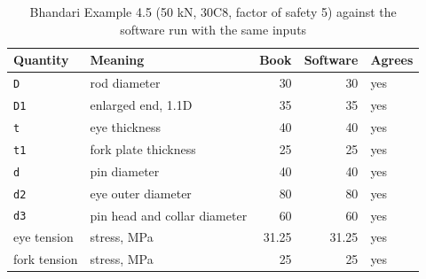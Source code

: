 \begin{table}[htbp]
\centering\footnotesize
\caption{Bhandari Example 4.5 (50 kN, 30C8, factor of safety 5) against the software run with the same inputs}\label{tab:bhandari}
\begin{tabularx}{\textwidth}{llrrl}
\toprule
Quantity & Meaning & Book & Software & Agrees \\
\midrule
\texttt{D} & rod diameter & 30 & 30 & yes \\
\texttt{D1} & enlarged end, 1.1D & 35 & 35 & yes \\
\texttt{t} & eye thickness & 40 & 40 & yes \\
\texttt{t1} & fork plate thickness & 25 & 25 & yes \\
\texttt{d} & pin diameter & 40 & 40 & yes \\
\texttt{d2} & eye outer diameter & 80 & 80 & yes \\
\texttt{d3} & pin head and collar diameter & 60 & 60 & yes \\
eye tension & stress, MPa & 31.25 & 31.25 & yes \\
fork tension & stress, MPa & 25 & 25 & yes \\
\bottomrule
\end{tabularx}
\end{table}
